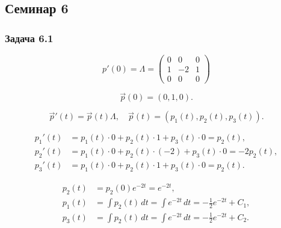 \subsection{Семинар 6}

\subsubsection*{Задача 6.1}

\[
	p'(0)=\Lambda =
	\begin{pmatrix}
		0 & 0  & 0 \\
		1 & -2 & 1 \\
		0 & 0  & 0
	\end{pmatrix}
\]


\[
	\vec{p}(0) = (0,1,0).
\]

\[
	\vec{p}'(t) = \vec{p}(t)\Lambda,\quad \vec{p}(t)=(p_1(t),p_2(t),p_3(t)).
\]

\[
	\begin{aligned}
		p_1'(t) & = p_1 (t)\cdot 0 + p_2(t)\cdot 1 + p_3(t)\cdot 0 = p_2(t),     \\
		p_2'(t) & = p_1 (t)\cdot 0 + p_2(t)\cdot(-2) + p_3(t)\cdot 0 = -2p_2(t), \\
		p_3'(t) & = p_1 (t)\cdot 0 + p_2(t)\cdot 1 + p_3(t)\cdot 0 = p_2(t).
	\end{aligned}
\]

\[
	\begin{aligned}
		p_2(t) & = p_2(0)e^{-2t} = e^{-2t},                                       \\
		p_1(t) & = \int p_2(t)\,dt = \int e^{-2t}\,dt = -\tfrac{1}{2}e^{-2t}+C_1, \\
		p_3(t) & = \int p_2(t)\,dt = \int e^{-2t}\,dt = -\tfrac{1}{2}e^{-2t}+C_2.
	\end{aligned}
\]

